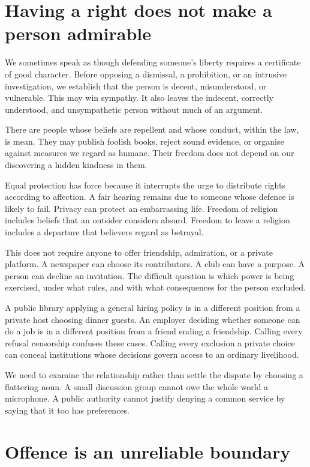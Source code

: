\documentclass[12pt,a4paper]{book}
\begin{document}
\section*{Having a right does not make a person admirable}

We sometimes speak as though defending someone's liberty requires a certificate of good character. Before opposing a dismissal, a prohibition, or an intrusive investigation, we establish that the person is decent, misunderstood, or vulnerable. This may win sympathy. It also leaves the indecent, correctly understood, and unsympathetic person without much of an argument.

There are people whose beliefs are repellent and whose conduct, within the law, is mean. They may publish foolish books, reject sound evidence, or organise against measures we regard as humane. Their freedom does not depend on our discovering a hidden kindness in them.

Equal protection has force because it interrupts the urge to distribute rights according to affection. A fair hearing remains due to someone whose defence is likely to fail. Privacy can protect an embarrassing life. Freedom of religion includes beliefs that an outsider considers absurd. Freedom to leave a religion includes a departure that believers regard as betrayal.

This does not require anyone to offer friendship, admiration, or a private platform. A newspaper can choose its contributors. A club can have a purpose. A person can decline an invitation. The difficult question is which power is being exercised, under what rules, and with what consequences for the person excluded.

A public library applying a general hiring policy is in a different position from a private host choosing dinner guests. An employer deciding whether someone can do a job is in a different position from a friend ending a friendship. Calling every refusal censorship confuses these cases. Calling every exclusion a private choice can conceal institutions whose decisions govern access to an ordinary livelihood.

We need to examine the relationship rather than settle the dispute by choosing a flattering noun. A small discussion group cannot owe the whole world a microphone. A public authority cannot justify denying a common service by saying that it too has preferences.

\section*{Offence is an unreliable boundary}
\end{document}
